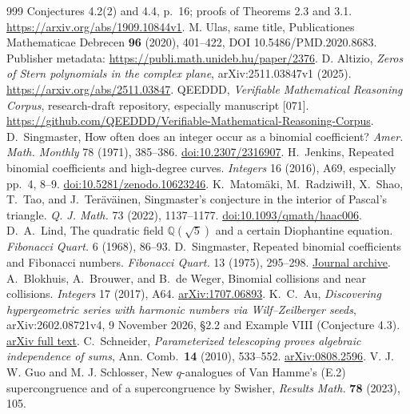 \documentclass[11pt,a4paper]{article}
\begin{document}
\begin{thebibliography}{999}
Conjectures 4.2(2) and 4.4, p.~16; proofs of Theorems 2.3 and 3.1.
\url{https://arxiv.org/abs/1909.10844v1}.
M. Ulas, same title, Publicationes Mathematicae Debrecen
\textbf{96} (2020), 401--422, DOI 10.5486/PMD.2020.8683.
Publisher metadata: \url{https://publi.math.unideb.hu/paper/2376}.
D. Altizio, \emph{Zeros of Stern polynomials in the complex
plane}, arXiv:2511.03847v1 (2025).
\url{https://arxiv.org/abs/2511.03847}.
QEEDDD, \emph{Verifiable Mathematical Reasoning Corpus},
research-draft repository, especially manuscript [071].
\url{https://github.com/QEEDDD/Verifiable-Mathematical-Reasoning-Corpus}.
D.\ Singmaster, How often does an integer occur as a binomial coefficient? \emph{Amer. Math. Monthly} 78 (1971), 385--386. \href{https://doi.org/10.2307/2316907}{doi:10.2307/2316907}.
H.\ Jenkins, Repeated binomial coefficients and high-degree curves. \emph{Integers} 16 (2016), A69, especially pp.~4, 8--9. \href{https://doi.org/10.5281/zenodo.10623246}{doi:10.5281/zenodo.10623246}.
K.\ Matom\"aki, M.\ Radziwi\l\l, X.\ Shao, T.\ Tao, and J.\ Ter\"av\"ainen, Singmaster's conjecture in the interior of Pascal's triangle. \emph{Q. J. Math.} 73 (2022), 1137--1177. \href{https://doi.org/10.1093/qmath/haac006}{doi:10.1093/qmath/haac006}.
D.\ A.\ Lind, The quadratic field \(\mathbb Q(\sqrt 5)\) and a certain Diophantine equation. \emph{Fibonacci Quart.} 6 (1968), 86--93.
D.\ Singmaster, Repeated binomial coefficients and Fibonacci numbers. \emph{Fibonacci Quart.} 13 (1975), 295--298. \href{https://www.fq.math.ca/Scanned/13-4/singmaster.pdf}{Journal archive}.
A.\ Blokhuis, A.\ Brouwer, and B.\ de Weger, Binomial collisions and near collisions. \emph{Integers} 17 (2017), A64. \href{https://arxiv.org/abs/1707.06893}{arXiv:1707.06893}.
K.~C.~Au, \emph{Discovering hypergeometric series with
harmonic numbers via Wilf--Zeilberger seeds}, arXiv:2602.08721v4,
9 November 2026, \S2.2 and Example VIII (Conjecture 4.3).
\href{https://arxiv.org/html/2602.08721v4}{arXiv full text}.
C.~Schneider, \emph{Parameterized telescoping
proves algebraic independence of sums}, Ann. Comb.\ \textbf{14}
(2010), 533--552. \href{https://arxiv.org/abs/0808.2596}{arXiv:0808.2596}.
V. J. W. Guo and M. J. Schlosser, New \(q\)-analogues
of Van Hamme's (E.2) supercongruence and of a supercongruence by Swisher,
\emph{Results Math.} \textbf{78} (2023), 105.

\end{thebibliography}
\end{document}
